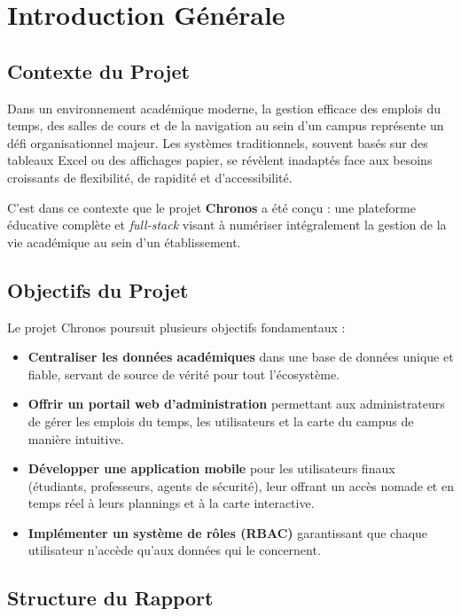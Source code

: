 \documentclass[12pt, a4paper]{report}
\begin{document}
\chapter{Introduction Générale}

\section{Contexte du Projet}

Dans un environnement académique moderne, la gestion efficace des emplois du temps, des salles de cours et de la navigation au sein d'un campus représente un défi organisationnel majeur. Les systèmes traditionnels, souvent basés sur des tableaux Excel ou des affichages papier, se révèlent inadaptés face aux besoins croissants de flexibilité, de rapidité et d'accessibilité.

C'est dans ce contexte que le projet \textbf{Chronos} a été conçu : une plateforme éducative complète et \textit{full-stack} visant à numériser intégralement la gestion de la vie académique au sein d'un établissement.

\section{Objectifs du Projet}

Le projet Chronos poursuit plusieurs objectifs fondamentaux :

\begin{itemize}[leftmargin=2cm]
    \item[\textbf{1.}] \textbf{Centraliser les données académiques} dans une base de données unique et fiable, servant de source de vérité pour tout l'écosystème.
    \item[\textbf{2.}] \textbf{Offrir un portail web d'administration} permettant aux administrateurs de gérer les emplois du temps, les utilisateurs et la carte du campus de manière intuitive.
    \item[\textbf{3.}] \textbf{Développer une application mobile} pour les utilisateurs finaux (étudiants, professeurs, agents de sécurité), leur offrant un accès nomade et en temps réel à leurs plannings et à la carte interactive.
    \item[\textbf{4.}] \textbf{Implémenter un système de rôles (RBAC)} garantissant que chaque utilisateur n'accède qu'aux données qui le concernent.
\end{itemize}

\section{Structure du Rapport}
\end{document}
